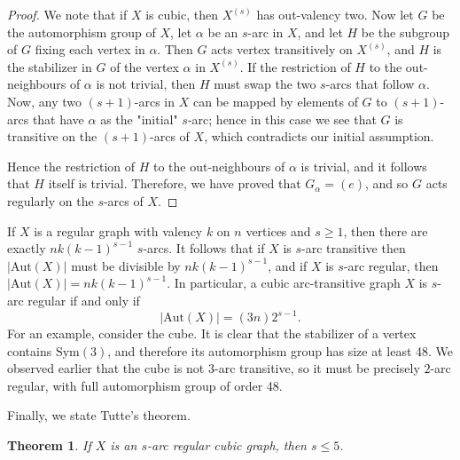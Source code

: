 \documentclass[12pt,a4paper,openany]{book}
\newtheorem{theorem}{Theorem}[section]
\begin{document}
\begin{proof}
We note that if $X$ is cubic, then $X^{(s)}$ has out-valency two. Now let $G$ be the automorphism group of $X$, let $\alpha$ be an $s$-arc in $X$, and let $H$ be the subgroup of $G$ fixing each vertex in $\alpha$. Then $G$ acts vertex transitively on $X^{(s)}$, and $H$ is the stabilizer in $G$ of the vertex $\alpha$ in $X^{(s)}$. If the restriction of $H$ to the out-neighbours of $\alpha$ is not trivial, then $H$ must swap the two $s$-arcs that follow $\alpha$. Now, any two $(s + 1)$-arcs in $X$ can be mapped by elements of $G$ to $(s + 1)$-arcs that have $\alpha$ as the "initial" $s$-arc; hence in this case we see that $G$ is transitive on the $(s + 1)$-arcs of $X$, which contradicts our initial assumption.

Hence the restriction of $H$ to the out-neighbours of $\alpha$ is trivial, and it follows  that $H$ itself is trivial. Therefore, we have proved that $G_\alpha = (e)$, and so $G$ acts regularly on the $s$-arcs of $X$.
\end{proof}

If $X$ is a regular graph with valency $k$ on $n$ vertices and $s \geq 1$, then there are exactly $nk(k - 1)^{s-1}$ $s$-arcs. It follows that if $X$ is $s$-arc transitive then $|\text{Aut}(X)|$ must be divisible by $nk(k - 1)^{s-1}$, and if $X$ is $s$-arc regular, then $|\text{Aut}(X)| = nk(k - 1)^{s-1}$. In particular, a cubic arc-transitive graph $X$ is $s$-arc regular if and only if 
\[
|\text{Aut}(X)| = (3n)2^{s-1}.
\]
For an example, consider the cube. It is clear that the stabilizer of a vertex contains $\text{Sym}(3)$, and therefore its automorphism group has size at least 48. We observed earlier that the cube is not $3$-arc transitive, so  it must be precisely $2$-arc regular, with full automorphism group of order 48.



Finally, we state Tutte's theorem.

\begin{theorem}
If $X$ is an $s$-arc regular cubic graph, then $s \leq 5$.
\end{theorem}
\end{document}
